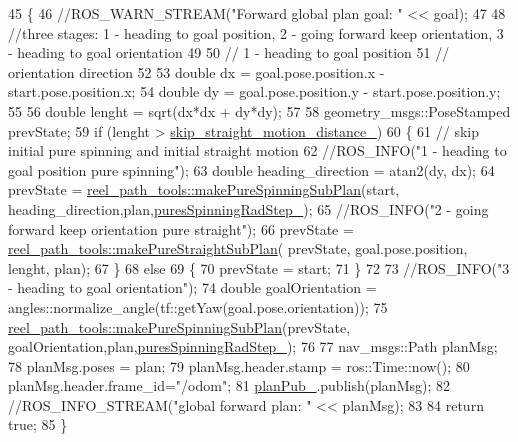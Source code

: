 \begin{DoxyCode}
45 \{
46     \textcolor{comment}{//ROS\_WARN\_STREAM("Forward global plan goal: " << goal);}
47 
48     \textcolor{comment}{//three stages: 1 - heading to goal position, 2 - going forward keep orientation, 3 - heading to goal
       orientation}
49 
50     \textcolor{comment}{// 1 - heading to goal position}
51     \textcolor{comment}{// orientation direction}
52 
53     \textcolor{keywordtype}{double} dx = goal.pose.position.x - start.pose.position.x;
54     \textcolor{keywordtype}{double} dy = goal.pose.position.y - start.pose.position.y;
55 
56     \textcolor{keywordtype}{double} lenght = sqrt(dx*dx + dy*dy);
57 
58     geometry\_msgs::PoseStamped prevState;
59     \textcolor{keywordflow}{if} (lenght > \hyperlink{classforward__global__planner_1_1ForwardGlobalPlanner_a0e10cd64069d5723fbdb896fdcead82c}{skip\_straight\_motion\_distance\_}) 
60     \{   
61         \textcolor{comment}{// skip initial pure spinning and initial straight motion}
62         \textcolor{comment}{//ROS\_INFO("1 - heading to goal position pure spinning");}
63         \textcolor{keywordtype}{double} heading\_direction = atan2(dy, dx);
64         prevState = \hyperlink{namespacereel__path__tools_a3fccdb259ebb9a3530e2341142b68d1e}{reel\_path\_tools::makePureSpinningSubPlan}(start,
      heading\_direction,plan,\hyperlink{classforward__global__planner_1_1ForwardGlobalPlanner_aa4247993c6651700fdaf8c067de19d8f}{puresSpinningRadStep\_});
65         \textcolor{comment}{//ROS\_INFO("2 - going forward keep orientation pure straight");}
66         prevState = \hyperlink{namespacereel__path__tools_a5d207487104c71b1d9c4fb12975bbf82}{reel\_path\_tools::makePureStraightSubPlan}(
      prevState, goal.pose.position,  lenght, plan);
67     \}
68     \textcolor{keywordflow}{else}
69     \{
70         prevState = start;
71     \}
72 
73     \textcolor{comment}{//ROS\_INFO("3 - heading to goal orientation");}
74     \textcolor{keywordtype}{double} goalOrientation = angles::normalize\_angle(tf::getYaw(goal.pose.orientation));
75     \hyperlink{namespacereel__path__tools_a3fccdb259ebb9a3530e2341142b68d1e}{reel\_path\_tools::makePureSpinningSubPlan}(prevState,
      goalOrientation,plan,\hyperlink{classforward__global__planner_1_1ForwardGlobalPlanner_aa4247993c6651700fdaf8c067de19d8f}{puresSpinningRadStep\_});
76     
77     nav\_msgs::Path planMsg;
78     planMsg.poses = plan;
79     planMsg.header.stamp = ros::Time::now();
80     planMsg.header.frame\_id=\textcolor{stringliteral}{"/odom"};
81     \hyperlink{classforward__global__planner_1_1ForwardGlobalPlanner_a4b20efe94ece6437775470088095132a}{planPub\_}.publish(planMsg);
82     \textcolor{comment}{//ROS\_INFO\_STREAM("global forward plan: " << planMsg);}
83 
84     \textcolor{keywordflow}{return} \textcolor{keyword}{true};
85 \}
\end{DoxyCode}


